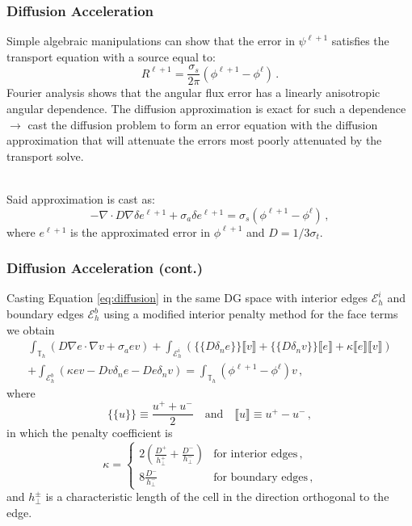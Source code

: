 \documentclass[xcolor={usenames,dvipsnames,svgnames,table}, 10pt]{beamer}
\begin{document}
\begin{frame}\frametitle{Diffusion Acceleration}
	Simple algebraic manipulations can show that the error in $\psi^{\ell + 1}$ satisfies the transport equation with a source equal to:
	\[
		R^{\ell + 1} = \frac{\sigma_s}{2\pi} (\phi^{\ell + 1} - \phi^\ell)\,.
	\]
	Fourier analysis shows that the angular flux error has a linearly anisotropic angular dependence. The diffusion approximation is exact for such a dependence $\rightarrow$ cast the diffusion problem to form an error equation with the diffusion approximation that will attenuate the errors most poorly attenuated by the transport solve.\\~
	
	Said approximation is cast as:
	\begin{equation}
		\label{eq:diffusion}
		-\nabla \cdot D \nabla \delta e^{\ell + 1} + \sigma_a \delta e^{\ell + 1} = \sigma_s \left( \phi^{\ell + 1} - \phi^\ell\right)\,,
	\end{equation}
	where $e^{\ell+1}$ is the approximated error in $\phi^{\ell + 1}$ and $D = 1/3 \sigma_t$.
\end{frame}


\begin{frame}\frametitle{Diffusion Acceleration (cont.)}
	Casting Equation \eqref{eq:diffusion} in the same DG space with interior edges $\mathcal{E}_h^i$ and boundary edges $\mathcal{E}_h^b$ using a modified interior penalty method for the face terms we obtain
	\begin{multline}
		\int_{\mathbb{T}_h} (D \nabla e \cdot \nabla v + \sigma_a e v) + \int_{\mathcal{E}_h^i} \left( \{\!\!\{ D \delta_n e \}\!\!\} \llbracket v \rrbracket + \{\!\!\{ D \delta_n v \}\!\!\} \llbracket e \rrbracket + \kappa \llbracket e \rrbracket \llbracket v \rrbracket \right) \\
		+ \int_{\mathcal{E}_h^b} \left( \kappa e v - D v \delta_n e - D e \delta_n v \right) = \int_{\mathbb{T}_h} (\phi^{\ell + 1} - \phi^\ell) v\,,
	\end{multline}
	where
	\[
		\{\!\!\{ u \}\!\!\} \equiv \frac{u^+ + u^-}{2} \quad \text{and} \quad \llbracket u \rrbracket \equiv u^+ - u^-\,,
	\]
	in which the penalty coefficient is
	\[
		\kappa = \begin{cases} 2 \left(\frac{D^+}{h^+_\bot} + \frac{D^-}{h^-_\bot}\right) & \text{for~interior~edges}\,, \\ 8 \frac{D^-}{h^-_\bot} & \text{for~boundary~edges}\,, \end{cases}
	\]
	and $h^\pm_\bot$ is a characteristic length of the cell in the direction orthogonal to the edge.
\end{frame}
\end{document}
